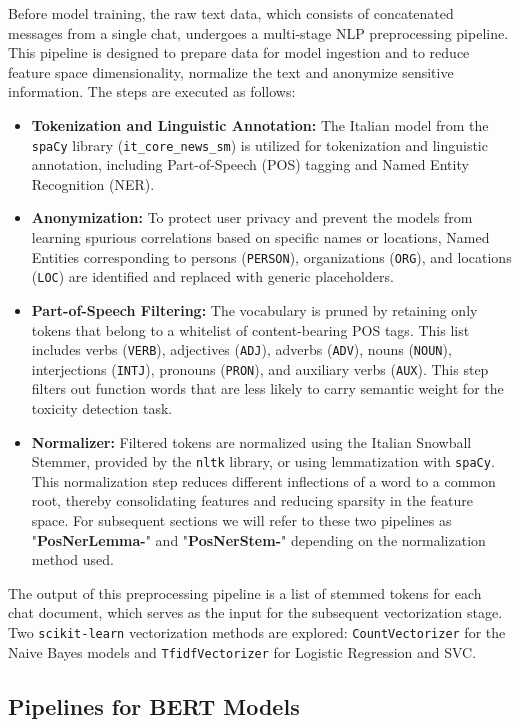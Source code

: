 \documentclass[twocolumn]{ceurart}
\begin{document}
Before model training, the raw text data, which consists of concatenated messages from a single chat, undergoes a multi-stage NLP preprocessing pipeline. This pipeline is designed to prepare data for model ingestion and to reduce feature space dimensionality, normalize the text and anonymize sensitive information. The steps are executed as follows:
\begin{itemize}
    \item \textbf{Tokenization and Linguistic Annotation:} The Italian model from the \texttt{spaCy} library (\texttt{it\_core\_news\_sm}) is utilized for tokenization and linguistic annotation, including Part-of-Speech (POS) tagging and Named Entity Recognition (NER).
    \item \textbf{Anonymization:} To protect user privacy and prevent the models from learning spurious correlations based on specific names or locations, Named Entities corresponding to persons (\texttt{PERSON}), organizations (\texttt{ORG}), and locations (\texttt{LOC}) are identified and replaced with generic placeholders.
    \item \textbf{Part-of-Speech Filtering:} The vocabulary is pruned by retaining only tokens that belong to a whitelist of content-bearing POS tags. This list includes verbs (\texttt{VERB}), adjectives (\texttt{ADJ}), adverbs (\texttt{ADV}), nouns (\texttt{NOUN}), interjections (\texttt{INTJ}), pronouns (\texttt{PRON}), and auxiliary verbs (\texttt{AUX}). This step filters out function words that are less likely to carry semantic weight for the toxicity detection task.
    \item \textbf{Normalizer:} Filtered tokens are normalized using the Italian Snowball Stemmer, provided by the \texttt{nltk} library, or using lemmatization with \texttt{spaCy}. This normalization step reduces different inflections of a word to a common root, thereby consolidating features and reducing sparsity in the feature space. For subsequent sections we will refer to these two pipelines as "\textbf{PosNerLemma-}" and "\textbf{PosNerStem-}" depending on the normalization method used.
\end{itemize}
The output of this preprocessing pipeline is a list of stemmed tokens for each chat document, which serves as the input for the subsequent vectorization stage. Two \texttt{scikit-learn} vectorization methods are explored: \texttt{CountVectorizer} for the Naive Bayes models and \texttt{TfidfVectorizer} for Logistic Regression and SVC.

\subsection{Pipelines for BERT Models}
\end{document}
